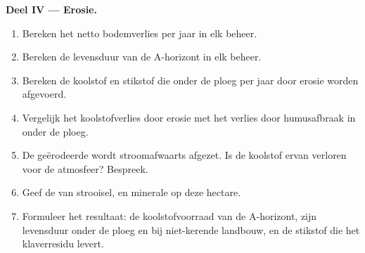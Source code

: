 \begin{problem}
\medskip
\noindent\textbf{Deel IV --- Erosie.}
\begin{enumerate}[resume]
  \item Bereken het netto bodemverlies per jaar in elk beheer.
  \item Bereken de levensduur van de A-horizont in elk beheer.
  \item Bereken de koolstof en stikstof die onder de ploeg per jaar door
        erosie worden afgevoerd.
  \item Vergelijk het koolstofverlies door erosie met het verlies door
        humusafbraak in  onder de ploeg.
  \item De geërodeerde  wordt stroomafwaarts afgezet. Is de koolstof ervan
        verloren voor de atmosfeer? Bespreek.
  \item Geef de  van strooisel,  en minerale 
        op deze hectare.
  \item Formuleer het resultaat: de koolstofvoorraad van de A-horizont, zijn
        levensduur onder de ploeg en bij niet-kerende landbouw, en de
        stikstof die het klaverresidu levert.
\end{enumerate}
\end{problem}
